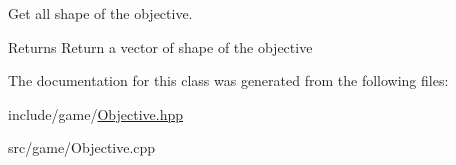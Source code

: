Get all shape of the objective. 

\begin{DoxyReturn}{Returns}
Return a vector of shape of the objective 
\end{DoxyReturn}


The documentation for this class was generated from the following files\+:\begin{DoxyCompactItemize}
\item 
include/game/\hyperlink{Objective_8hpp}{Objective.\+hpp}\item 
src/game/Objective.\+cpp\end{DoxyCompactItemize}

